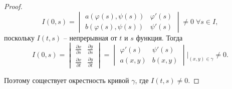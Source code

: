 \documentclass[a4paper, 12pt]{article}
\begin{document}
\begin{proof}
        \begin{equation*}
            I(0, s) = 
            \begin{vmatrix}
                a(\varphi(s), \psi(s)) & \varphi'(s) \\
                b(\varphi(s), \psi(s)) & \psi'(s)
            \end{vmatrix} \neq 0 \; \forall s \in I,
        \end{equation*}
        поскольку $I(t, s)$ -- непрерывная от $t$ и $s$ функция. Тогда
        \begin{equation*}
            I(0, s) =
            \begin{vmatrix}
                \frac{\partial x}{\partial s} & \frac{\partial y}{\partial s} \\
                \frac{\partial x}{\partial t} & \frac{\partial y}{\partial t}
            \end{vmatrix} =
            \begin{vmatrix}
                \varphi'(s) & \psi'(s) \\
                a(x, y) & b(x, y)
            \end{vmatrix} \bigg|_{(x, y) \in \gamma} \neq 0.
        \end{equation*}

        Поэтому соществует окрестность кривой $\gamma$, где $I(t, s) \neq 0$.



    \end{proof}
\end{document}
